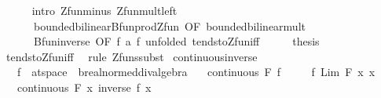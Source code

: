 \begin{isabellebody}
\ \ \ \ \isamarkupfalse%
\ {\isacharparenleft}{\kern0pt}intro\ Zfun{\isacharunderscore}{\kern0pt}minus\ Zfun{\isacharunderscore}{\kern0pt}mult{\isacharunderscore}{\kern0pt}left\isanewline
\ \ \ \ \ \ bounded{\isacharunderscore}{\kern0pt}bilinear{\isachardot}{\kern0pt}Bfun{\isacharunderscore}{\kern0pt}prod{\isacharunderscore}{\kern0pt}Zfun\ {\isacharbrackleft}{\kern0pt}OF\ bounded{\isacharunderscore}{\kern0pt}bilinear{\isacharunderscore}{\kern0pt}mult{\isacharbrackright}{\kern0pt}\isanewline
\ \ \ \ \ \ Bfun{\isacharunderscore}{\kern0pt}inverse\ {\isacharbrackleft}{\kern0pt}OF\ f\ a{\isacharbrackright}{\kern0pt}\ f\ {\isacharbrackleft}{\kern0pt}unfolded\ tendsto{\isacharunderscore}{\kern0pt}Zfun{\isacharunderscore}{\kern0pt}iff{\isacharbrackright}{\kern0pt}{\isacharparenright}{\kern0pt}\isanewline
\ \ \isamarkupfalse%
\ \isamarkupfalse%
\ {\isacharquery}{\kern0pt}thesis\isanewline
\ \ \ \ \isamarkupfalse%
\ tendsto{\isacharunderscore}{\kern0pt}Zfun{\isacharunderscore}{\kern0pt}iff\ \isamarkupfalse%
\ {\isacharparenleft}{\kern0pt}rule\ Zfun{\isacharunderscore}{\kern0pt}ssubst{\isacharparenright}{\kern0pt}\isanewline
{}\isamarkupfalse%
%
\endisatagproof
{\isafoldproof}%
%
\isadelimproof
\isanewline
%
\endisadelimproof
\isanewline
{}\isamarkupfalse%
\ continuous{\isacharunderscore}{\kern0pt}inverse{\isacharcolon}{\kern0pt}\isanewline
\ \ \ f\ {\isacharcolon}{\kern0pt}{\isacharcolon}{\kern0pt}\ {\isachardoublequoteopen}{\isacharprime}{\kern0pt}a{\isacharcolon}{\kern0pt}{\isacharcolon}{\kern0pt}t{}{\isacharunderscore}{\kern0pt}space\ {\isasymRightarrow}\ {\isacharprime}{\kern0pt}b{\isacharcolon}{\kern0pt}{\isacharcolon}{\kern0pt}real{\isacharunderscore}{\kern0pt}normed{\isacharunderscore}{\kern0pt}div{\isacharunderscore}{\kern0pt}algebra{\isachardoublequoteclose}\isanewline
\ \ \ {\isachardoublequoteopen}continuous\ F\ f{\isachardoublequoteclose}\isanewline
\ \ \ \ \ {\isachardoublequoteopen}f\ {\isacharparenleft}{\kern0pt}Lim\ F\ {\isacharparenleft}{\kern0pt}{\isasymlambda}x{\isachardot}{\kern0pt}\ x{\isacharparenright}{\kern0pt}{\isacharparenright}{\kern0pt}\ {\isasymnoteq}\ {}{\isachardoublequoteclose}\isanewline
\ \ \ {\isachardoublequoteopen}continuous\ F\ {\isacharparenleft}{\kern0pt}{\isasymlambda}x{\isachardot}{\kern0pt}\ inverse\ {\isacharparenleft}{\kern0pt}f\ x{\isacharparenright}{\kern0pt}{\isacharparenright}{\kern0pt}{\isachardoublequoteclose}\isanewline

\end{isabellebody}

